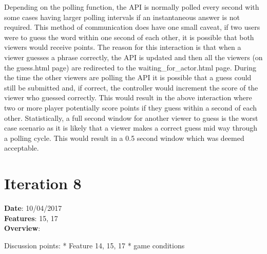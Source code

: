 Depending on the polling function, the API is normally polled every second with some cases having larger polling intervals if  an instantaneous answer is not required. This method of communication does have one small caveat, if two users were to guess the word within one second of each other, it is possible that both viewers would receive points. The reason for this interaction is that when a viewer guesses a phrase correctly, the API is updated and then all the viewers (on the guess.html page) are redirected to the waiting\_for\_actor.html page. During the time the other viewers are polling the API it is possible that a guess could still be submitted and, if correct, the controller would increment the score of the viewer who guessed correctly. This would result in the above interaction where two or more player potentially score points if they guess within a second of each other. Statistically, a full second window for another viewer to guess is the worst case scenario as it is likely that a viewer makes a correct guess mid way through a polling cycle. This would result in a 0.5 second window which was deemed acceptable.


\newpage

\section{Iteration 8}
\textbf{Date}: 10/04/2017 \\
\textbf{Features}: 15, 17 \\
\textbf{Overview}:

Discussion points:
* Feature 14, 15, 17
* game conditions